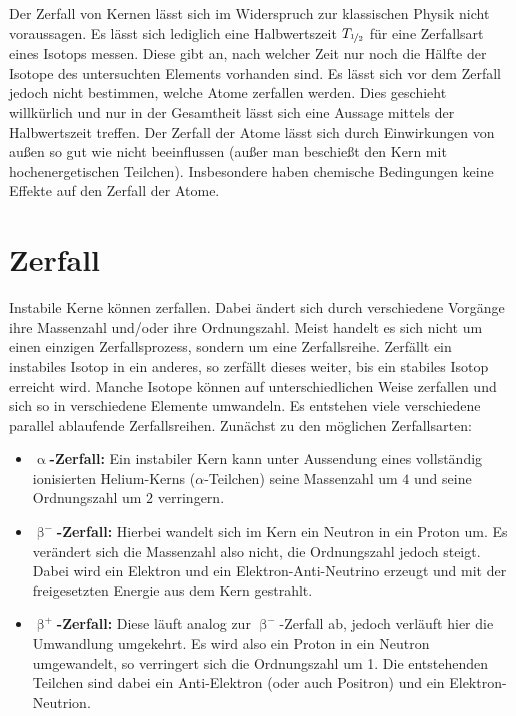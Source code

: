 Der Zerfall von Kernen lässt sich im Widerspruch zur klassischen Physik nicht voraussagen. Es lässt sich lediglich eine Halbwertszeit $T_{\nicefrac{1}{2}}$ für eine Zerfallsart eines Isotops messen. Diese gibt an, nach welcher Zeit nur noch die Hälfte der Isotope des untersuchten Elements vorhanden sind. Es lässt sich vor dem Zerfall jedoch nicht bestimmen, welche Atome zerfallen werden. Dies geschieht willkürlich und nur in der Gesamtheit lässt sich eine Aussage mittels der Halbwertszeit treffen. Der Zerfall der Atome lässt sich durch Einwirkungen von außen so gut wie nicht beeinflussen (außer man beschießt den Kern mit hochenergetischen Teilchen). Insbesondere haben chemische Bedingungen keine Effekte auf den Zerfall der Atome.\\

\section{Zerfall}
Instabile Kerne können zerfallen. Dabei ändert sich durch verschiedene Vorgänge ihre Massenzahl und/oder ihre Ordnungszahl. Meist handelt es sich nicht um einen einzigen Zerfallsprozess, sondern um eine Zerfallsreihe. Zerfällt ein instabiles Isotop in ein anderes, so zerfällt dieses weiter, bis ein stabiles Isotop erreicht wird. Manche Isotope können auf unterschiedlichen Weise zerfallen und sich so in verschiedene Elemente umwandeln. Es entstehen viele verschiedene parallel ablaufende Zerfallsreihen. Zunächst zu den möglichen Zerfallsarten:
\begin{itemize}
 \item{\textbf{$\upalpha$-Zerfall:}} Ein instabiler Kern kann unter Aussendung eines vollständig ionisierten Helium-Kerns ($\alpha$-Teilchen) seine Massenzahl um $4$ und seine Ordnungszahl um $2$ verringern.
 \item{\textbf{$\upbeta^-$-Zerfall:}} Hierbei wandelt sich im Kern ein Neutron in ein Proton um. Es verändert sich die Massenzahl also nicht, die Ordnungszahl jedoch steigt. Dabei wird ein Elektron und ein Elektron-Anti-Neutrino erzeugt und mit der freigesetzten Energie aus dem Kern gestrahlt.
 \item{\textbf{$\upbeta^+$-Zerfall:}} Diese läuft analog zur $\upbeta^-$-Zerfall ab, jedoch verläuft hier die Umwandlung umgekehrt. Es wird also ein Proton in ein Neutron umgewandelt, so verringert sich die Ordnungszahl um 1. Die entstehenden Teilchen sind dabei ein Anti-Elektron (oder auch Positron) und ein Elektron-Neutrion.
\end{itemize}
